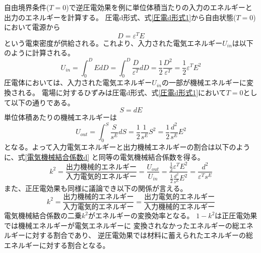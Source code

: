 \documentclass[dvipdfmx,12pt,a4paper]{jreport}
\begin{document}
			自由境界条件($T=0$)で逆圧電効果を例に単位体積当たりの入力のエネルギーと出力のエネルギーを計算する。
			圧電d形式、式\ref{圧電d形式1}から自由状態($T=0$)において電源から
			\begin{equation}
				D=\varepsilon^T E
			\end{equation}
			という電束密度が供給される。これより、入力された電気エネルギー$U_{in}$は以下のように計算される。
			\begin{equation}
				U_{in} = \int^{D}_0 E dD = \int^{D}_0 \frac{D}{\varepsilon^T} dD  
				= \frac{1}{2}\frac{D^2}{\varepsilon^T}
				= \frac{1}{2}\varepsilon^T E^2 
			\end{equation}
			圧電体においては、入力された電気エネルギー$U_{in}$の一部が機械エネルギーに変換される。
			電場に対するひずみは圧電d形式、式\ref{圧電d形式1}において$T=0$として以下の通りである。
			\begin{equation}
				S = d E
			\end{equation}
			単位体積あたりの機械エネルギーは
			\begin{equation}
				U_{out} = \int^S_0 \frac{S}{s^E} d S = \frac{1}{2} \frac{1}{s^E}S^2 
				= \frac{1}{2}\frac{d^2}{s^E}E^2
			\end{equation}
			となる。よって入力電気エネルギーと出力機械エネルギーの割合は以下のように、式\ref{電気機械結合係数d}
			と同等の電気機械結合係数を得る。
			\begin{equation}
				k^2 = \frac{\mbox{出力機械的エネルギー}}{\mbox{入力電気的エネルギー}}
				= \frac{U_{out}}{U_{in}} = \frac{\frac{1}{2}\varepsilon^T E^2}{\frac{1}{2}\frac{d^2}{s^E}E^2}
				= \frac{d^2}{\varepsilon^T s^E}
			\end{equation}
			また、正圧電効果も同様に議論でき以下の関係が言える。
			\begin{equation}
				k^2=\frac{\mbox{出力機械的エネルギー}}{\mbox{入力電気的エネルギー}}=
				\frac{\mbox{出力電気的エネルギー}}{\mbox{入力機械的エネルギー}}
				\label{電気機械結合係数の定義}
			\end{equation}
			電気機械結合係数の二乗$k^2$がエネルギーの変換効率となる。
			$1-k^2$は正圧電効果では機械エネルギーが電気エネルギーに
			変換されなかったエネルギーの総エネルギーに対する割合であり、
			逆圧電効果では材料に蓄えられたエネルギーの総エネルギーに対する割合となる。
\end{document}
